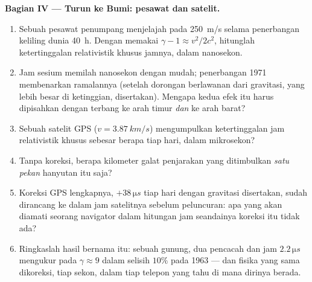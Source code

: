 \begin{problem}
\medskip\noindent\textbf{Bagian IV --- Turun ke Bumi: pesawat dan
satelit.}
\begin{enumerate}[resume]
  \item Sebuah pesawat penumpang menjelajah pada \qty{250}{m/s} selama
        penerbangan keliling dunia \qty{40}{h}. Dengan memakai
        $\gamma - 1 \approx v^2/2c^2$, hitunglah ketertinggalan
        relativistik khusus jamnya, dalam nanosekon.
  \item Jam sesium memilah nanosekon dengan mudah; penerbangan 1971
        membenarkan ramalannya (setelah dorongan berlawanan dari
        gravitasi, yang lebih besar di ketinggian, disertakan). Mengapa
        kedua efek itu harus dipisahkan dengan terbang ke arah timur
        \emph{dan} ke arah barat?
  \item Sebuah satelit GPS ($v = \qty{3.87}{km/s}$) mengumpulkan
        ketertinggalan jam relativistik khusus sebesar berapa tiap
        hari, dalam mikrosekon?
  \item Tanpa koreksi, berapa kilometer galat penjarakan yang
        ditimbulkan \emph{satu pekan} hanyutan itu saja?
  \item Koreksi GPS lengkapnya, $+38\,\unit{\micro s}$ tiap hari
        dengan gravitasi disertakan, sudah dirancang ke dalam jam
        satelitnya sebelum peluncuran: apa yang akan diamati seorang
        navigator dalam hitungan jam seandainya koreksi itu tidak ada?
  \item Ringkaslah hasil bernama itu: sebuah gunung, dua pencacah dan
        jam $2.2\,\unit{\micro s}$ mengukur  pada
        $\gamma \approx 9$ dalam selisih $10\%$ pada 1963 --- dan
        fisika yang sama dikoreksi, tiap sekon, dalam tiap telepon yang
        tahu di mana dirinya berada.
\end{enumerate}
\end{problem}
